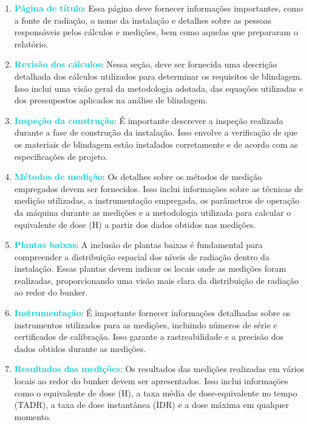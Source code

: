 \documentclass[11pt,a4paper]{article}
\begin{document}
	\begin{enumerate}[label=\textcolor{CarnationPink}{(\roman*)}]
		\item \textcolor{DarkTurquoise}{\textbf{Página de título}}: Essa página deve fornecer informações importantes, como a fonte de radiação, o nome da instalação e detalhes sobre as pessoas responsáveis pelos cálculos e medições, bem como aquelas que prepararam o relatório.

		\item \textcolor{DarkTurquoise}{\textbf{Revisão dos cálculos}}: Nessa seção, deve ser fornecida uma descrição detalhada dos cálculos utilizados para determinar os requisitos de blindagem. Isso inclui uma visão geral da metodologia adotada, das equações utilizadas e dos pressupostos aplicados na análise de blindagem.

		\item \textcolor{DarkTurquoise}{\textbf{Inspeção da construção}}: É importante descrever a inspeção realizada durante a fase de construção da instalação. Isso envolve a verificação de que os materiais de blindagem estão instalados corretamente e de acordo com as especificações de projeto.

		\item \textcolor{DarkTurquoise}{\textbf{Métodos de medição}}: Os detalhes sobre os métodos de medição empregados devem ser fornecidos. Isso inclui informações sobre as técnicas de medição utilizadas, a instrumentação empregada, os parâmetros de operação da máquina durante as medições e a metodologia utilizada para calcular o equivalente de dose (H) a partir dos dados obtidos nas medições.

		\item \textcolor{DarkTurquoise}{\textbf{Plantas baixas}}: A inclusão de plantas baixas é fundamental para compreender a distribuição espacial dos níveis de radiação dentro da instalação. Essas plantas devem indicar os locais onde as medições foram realizadas, proporcionando uma visão mais clara da distribuição de radiação ao redor do bunker.

		\item \textcolor{DarkTurquoise}{\textbf{Instrumentação}}: É importante fornecer informações detalhadas sobre os instrumentos utilizados para as medições, incluindo números de série e certificados de calibração. Isso garante a rastreabilidade e a precisão dos dados obtidos durante as medições.

		\item \textcolor{DarkTurquoise}{\textbf{Resultados das medições}}: Os resultados das medições realizadas em vários locais ao redor do bunker devem ser apresentados. Isso inclui informações como o equivalente de dose (H), a taxa média de dose-equivalente no tempo (TADR), a taxa de dose instantânea (IDR) e a dose máxima em qualquer momento.


\end{enumerate}
\end{document}
